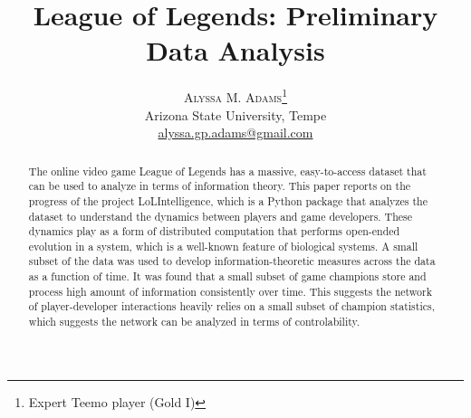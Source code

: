 \documentclass[twoside]{article}
\title{\vspace{-15mm}\fontsize{24pt}{10pt}\selectfont\textbf{League of Legends: Preliminary Data Analysis}} %
\author{
\large
\textsc{Alyssa M. Adams}\thanks{Expert Teemo player (Gold I)}\\[2mm] %
\normalsize Arizona State University, Tempe \\ %
\normalsize \href{mailto:alyssa.gp.adams@gmail.com}{alyssa.gp.adams@gmail.com} %
\vspace{-5mm}
}
\date{}
\begin{document}
\maketitle %

\thispagestyle{fancy} %


\begin{abstract}

\noindent The online video game League of Legends has a massive, easy-to-access dataset that can be used to analyze in terms of information theory. This paper reports on the progress of the project LoLIntelligence, which is a Python package that analyzes the dataset to understand the dynamics between players and game developers. These dynamics play as a form of distributed computation that performs open-ended evolution in a system, which is a well-known feature of biological systems. A small subset of the data was used to develop information-theoretic measures across the data as a function of time. It was found that a small subset of game champions store and process high amount of information consistently over time. This suggests the network of player-developer interactions heavily relies on a small subset of champion statistics, which suggests the network can be analyzed in terms of controlability.
\end{abstract}

\end{document}
